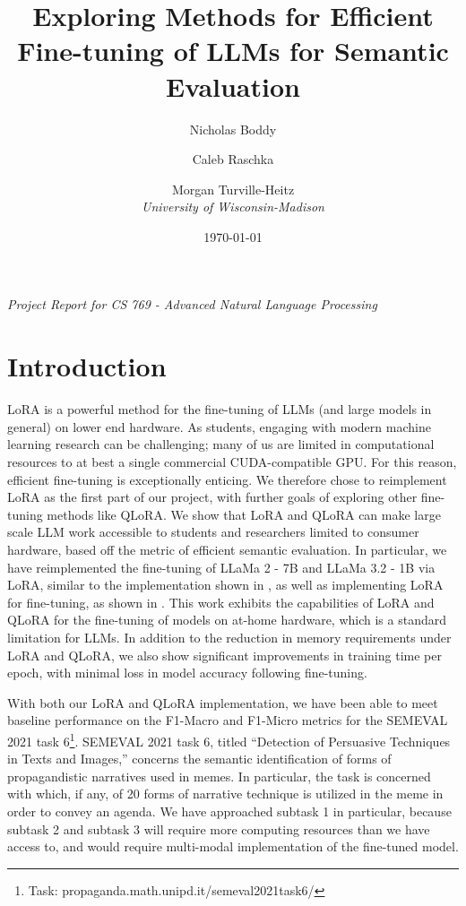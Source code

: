 \documentclass[11pt]{article}
\title{Exploring Methods for Efficient Fine-tuning of LLMs for Semantic Evaluation}
\author{
	Nicholas Boddy \and Caleb Raschka \and Morgan Turville-Heitz \\
	\textit{University of Wisconsin-Madison}
}
\date{\today}
\begin{document}
\maketitle

\begin{center}
	\textit{Project Report for CS 769 - Advanced Natural Language Processing}
\end{center}

\section{Introduction}

LoRA is a powerful method for the fine-tuning of LLMs (and large models in general) on lower end hardware. As students, engaging with modern machine learning research can be challenging; many of us are limited in computational resources to at best a single commercial CUDA-compatible GPU. For this reason, efficient fine-tuning is exceptionally enticing. We therefore chose to reimplement LoRA as the first part of our project, with further goals of exploring other fine-tuning methods like QLoRA. We show that LoRA and QLoRA can make large scale LLM work accessible to students and researchers limited to consumer hardware, based off the metric of efficient semantic evaluation. In particular, we have reimplemented the fine-tuning of LLaMa 2 - 7B and LLaMa 3.2 - 1B via LoRA, similar to the implementation shown in \cite{hu2021lora}, as well as implementing LoRA for fine-tuning, as shown in \cite{dettmers2023qlora}. This work exhibits the capabilities of LoRA and QLoRA for the fine-tuning of models on at-home hardware, which is a standard limitation for LLMs. In addition to the reduction in memory requirements under LoRA and QLoRA, we also show significant improvements in training time per epoch, with minimal loss in model accuracy following fine-tuning.

With both our LoRA and QLoRA implementation, we have been able to meet baseline performance on the F1-Macro and F1-Micro metrics for the SEMEVAL 2021 task 6\footnote{Task: propaganda.math.unipd.it/semeval2021task6/}. SEMEVAL 2021 task 6, titled “Detection of Persuasive Techniques in Texts and Images,” concerns the semantic identification of forms of propagandistic narratives used in memes. In particular, the task is concerned with which, if any, of 20 forms of narrative technique is utilized in the meme in order to convey an agenda. We have approached subtask 1 in particular, because subtask 2 and subtask 3 will require more computing resources than we have access to, and would require multi-modal implementation of the fine-tuned model.
\end{document}
